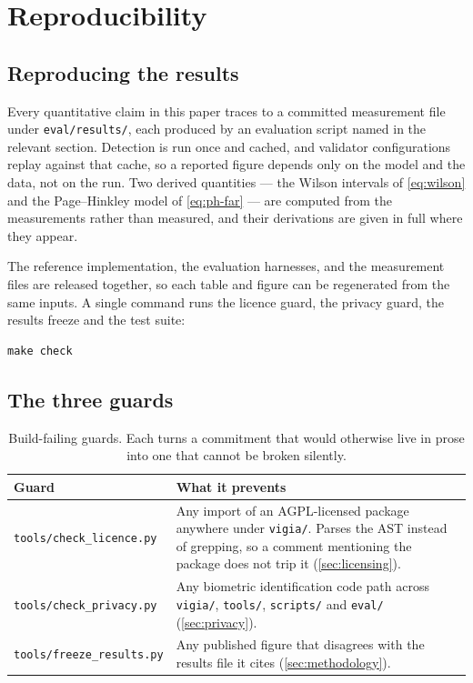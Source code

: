 \section{Reproducibility}
\label{sec:reproducibility}

\subsection{Reproducing the results}

Every quantitative claim in this paper traces to a committed measurement file
under \texttt{eval/results/}, each produced by an evaluation script named in
the relevant section. Detection is run once and cached, and validator
configurations replay against that cache, so a reported figure depends only on
the model and the data, not on the run. Two derived quantities — the Wilson
intervals of \cref{eq:wilson} and the Page--Hinkley model of
\cref{eq:ph-far} — are computed from the measurements rather than measured,
and their derivations are given in full where they appear.

The reference implementation, the evaluation harnesses, and the measurement
files are released together, so each table and figure can be regenerated from
the same inputs. A single command runs the licence guard, the privacy guard,
the results freeze and the test suite:

\begin{verbatim}
make check
\end{verbatim}

\subsection{The three guards}

\begin{table}[htbp]
\centering\small
\caption{Build-failing guards. Each turns a commitment that would otherwise
live in prose into one that cannot be broken silently.}
\label{tab:guards}
\begin{tabularx}{\textwidth}{l X}
\toprule
Guard & What it prevents \\
\midrule
\texttt{tools/check\_licence.py} & Any import of an AGPL-licensed package
anywhere under \texttt{vigia/}. Parses the AST instead of grepping, so a
comment mentioning the package does not trip it (\cref{sec:licensing}). \\
\addlinespace
\texttt{tools/check\_privacy.py} & Any biometric identification code path
across \texttt{vigia/}, \texttt{tools/}, \texttt{scripts/} and \texttt{eval/}
(\cref{sec:privacy}). \\
\addlinespace
\texttt{tools/freeze\_results.py} & Any published figure that disagrees with
the results file it cites (\cref{sec:methodology}). \\
\bottomrule
\end{tabularx}
\end{table}

